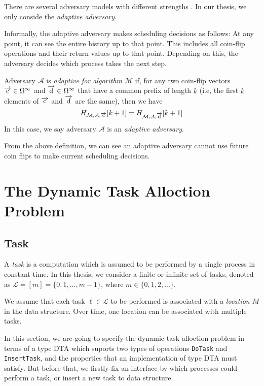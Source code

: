 There are several adversary models with different strengths \cite{DBLP:journals/corr/cs-DS-0209014}.
In our thesis, we only conside the \emph{adaptive adversary}.

Informally, the adaptive adversary makes scheduling
decisions as follows: At any point, it can see the entire history up to that point.
This includes all coin-flip operations and their return values up to that point. Depending on this,
the adversary decides which process takes the next step.

Adversary $\mathcal{A}$ is \emph{adaptive for algorithm $\mathcal{M}$} \cite{golab2011linearizable}
if, for any two coin-flip vectors $\overrightarrow{\rm c} \in \Omega^{\infty}$ and $\overrightarrow{\rm d} \in \Omega^{\infty}$ that have a common prefix
of length $k$ (i.e, the first $k$ elements of $\overrightarrow{\rm c}$ and $\overrightarrow{\rm d}$ are the same), then we have
$$H_{\mathcal{M},\mathcal{A}, \overrightarrow{\rm c}}[k+1] = H_{\mathcal{M},\mathcal{A}, \overrightarrow{\rm d}}[k+1]$$
In this case, we say adversary $\mathcal{A}$ is an \emph{adaptive adversary}.

From the above definition, we can see an adaptive adversary cannot use
future coin flips to make current scheduling decisions.

\section{The Dynamic Task Alloction Problem}

\subsection{Task}

A \emph{task} is a computation which is assumed to be performed by a single process in constant time\cite{georgiou2007all}.
In this thesis, we consider a finite or infinite set of tasks, denoted as $\mathcal{L} = [m] = \{0, 1, ..., m-1\}$,
where $m \in \{0, 1, 2, ...\}$.

We assume that each task $\ell \in \mathcal{L}$ to be performed is associated with a \emph{location} $M$
in the data structure. Over time, one location can be associated with multiple tasks.

In this section, we are going to specify the dynamic task alloction problem in terms of a type DTA which
suports two types of operations \texttt{DoTask} and \texttt{InsertTask}, and the properties
that an implementation of type DTA must satisfy. But before that, we firstly fix an interface by which processes could
perform a task, or insert a new task to data structure.

